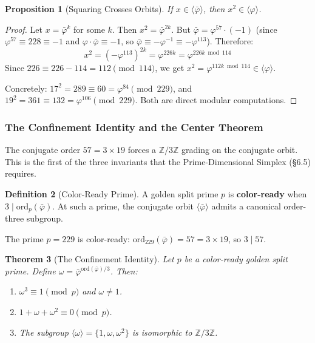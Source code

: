 \documentclass[12pt,oneside]{article}
\theoremstyle{principia}
\newtheorem{theorem}{Theorem}[section]
\newtheorem{proposition}[theorem]{Proposition}
\theoremstyle{definition}
\newtheorem{definition}[theorem]{Definition}
\theoremstyle{remark}
\providecommand{\ZZ}{\mathbb{Z}}
\providecommand{\vp}{\varphi}
\providecommand{\vpbar}{\bar{\varphi}}
\begin{document}
\begin{proposition}[Squaring Crosses Orbits]\label{prop:square-cross}
If $x \in \langle\vpbar\rangle$, then $x^2 \in \langle\vp\rangle$.
\end{proposition}
\begin{proof}
Let $x = \vpbar^k$ for some $k$. Then $x^2 = \vpbar^{2k}$. But $\vpbar = \vp^{57} \cdot (-1)$ (since $\vp^{57} \equiv 228 \equiv -1$ and $\vp \cdot \vpbar \equiv -1$, so $\vpbar \equiv -\vp^{-1} \equiv -\vp^{113}$). Therefore:
$$x^2 = (-\vp^{113})^{2k} = \vp^{226k} = \vp^{226k \bmod 114}$$
Since $226 \equiv 226 - 114 = 112 \pmod{114}$, we get $x^2 = \vp^{112k \bmod 114} \in \langle\vp\rangle$.

Concretely: $17^2 = 289 \equiv 60 = \vp^{84} \pmod{229}$, and $19^2 = 361 \equiv 132 = \vp^{106} \pmod{229}$. Both are direct modular computations. \qedhere
\end{proof}

\subsubsection*{The Confinement Identity and the Center Theorem}

The conjugate order $57 = 3 \times 19$ forces a $\ZZ/3\ZZ$ grading on the conjugate orbit. This is the first of the three invariants that the Prime-Dimensional Simplex (\S6.5) requires.

\begin{definition}[Color-Ready Prime]\label{def:color-ready}
A golden split prime $p$ is \textbf{color-ready} when $3 \mid \mathrm{ord}_p(\vpbar)$. At such a prime, the conjugate orbit $\langle\vpbar\rangle$ admits a canonical order-three subgroup.
\end{definition}

The prime $p = 229$ is color-ready: $\mathrm{ord}_{229}(\vpbar) = 57 = 3 \times 19$, so $3 \mid 57$.

\begin{theorem}[The Confinement Identity]\label{thm:confinement}
Let $p$ be a color-ready golden split prime. Define $\omega = \vpbar^{\mathrm{ord}(\vpbar)/3}$. Then:
\begin{enumerate}
\item $\omega^3 \equiv 1 \pmod{p}$ and $\omega \neq 1$.
\item $1 + \omega + \omega^2 \equiv 0 \pmod{p}$.
\item The subgroup $\langle\omega\rangle = \{1, \omega, \omega^2\}$ is isomorphic to $\ZZ/3\ZZ$.
\end{enumerate}
\end{theorem}
\end{document}
